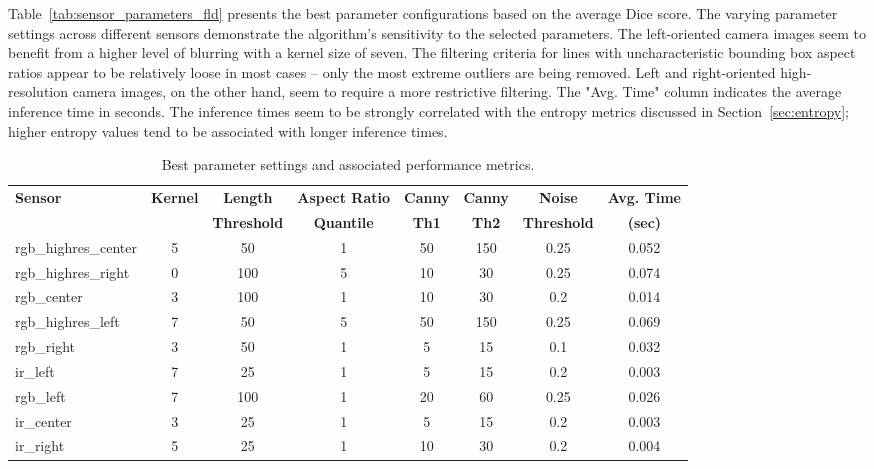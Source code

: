 \documentclass[Master,MDS,english]{BASE/twbook} %
\begin{document}
Table~\ref{tab:sensor_parameters_fld} presents the best parameter configurations based on the average Dice score. The varying parameter settings across different sensors demonstrate the algorithm's sensitivity to the selected parameters.
The left-oriented camera images seem to benefit from a higher level of blurring with a kernel size of seven. 
The filtering criteria for lines with uncharacteristic bounding box aspect ratios appear to be relatively loose in most cases -- only the most extreme outliers are being removed. Left and right-oriented high-resolution camera images, on the other hand, seem to require a more restrictive filtering. 
The "Avg. Time" column indicates the average inference time in seconds. The inference times seem to be strongly correlated with the entropy metrics discussed in Section~\ref{sec:entropy}; higher entropy values tend to be associated with longer inference times.


\begin{table}[htbp]
\footnotesize
    \centering
    \begin{tabular}{|l|c|c|c|c|c|c|c|}
        \hline
        \textbf{Sensor} & \textbf{Kernel} & \textbf{Length}  & \textbf{Aspect Ratio } & \textbf{Canny } & \textbf{Canny } & \textbf{Noise} & \textbf{Avg. Time } \\
         &  & \textbf{Threshold} & \textbf{Quantile} & \textbf{Th1} & \textbf{Th2} & \textbf{Threshold} & \textbf{(sec)} \\
        \hline
        rgb\_highres\_center & 5 & 50 & 1 & 50 & 150 & 0.25 & 0.052 \\
        rgb\_highres\_right & 0 & 100 & 5 & 10 & 30 & 0.25 & 0.074 \\
        rgb\_center & 3 & 100 & 1 & 10 & 30 & 0.2 & 0.014 \\
        rgb\_highres\_left & 7 & 50 & 5 & 50 & 150 & 0.25 & 0.069 \\
        rgb\_right & 3 & 50 & 1 & 5 & 15 & 0.1 & 0.032 \\
        ir\_left & 7 & 25 & 1 & 5 & 15 & 0.2 & 0.003 \\
        rgb\_left & 7 & 100 & 1 & 20 & 60 & 0.25 & 0.026 \\
        ir\_center & 3 & 25 & 1 & 5 & 15 & 0.2 & 0.003 \\
        ir\_right & 5 & 25 & 1 & 10 & 30 & 0.2 & 0.004 \\
        \hline
    \end{tabular}
      \caption{Best parameter settings and associated performance metrics.}
    \label{tab:sensor_parameters}
\end{table}
\end{document}
